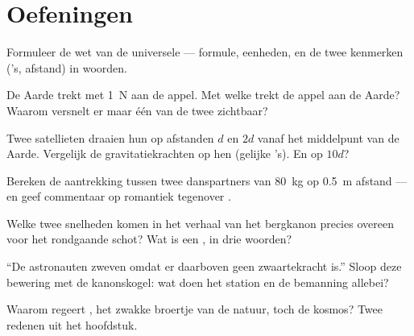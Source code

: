\section{Oefeningen}

\begin{exercise}[$\star$]\label{exo:g9:gravitation:1}
Formuleer de wet van de universele  --- formule,
eenheden, en de twee kenmerken ('s, afstand) in woorden.
\end{exercise}

\begin{exercise}[$\star$]\label{exo:g9:gravitation:2}
De Aarde trekt met \qty{1}{N} aan de appel. Met welke
 trekt de appel aan de Aarde? Waarom versnelt er maar
één van de twee zichtbaar?
\end{exercise}

\begin{exercise}[$\star$]\label{exo:g9:gravitation:3}
Twee satellieten draaien hun  op afstanden $d$ en $2d$
vanaf het middelpunt van de Aarde. Vergelijk de
gravitatiekrachten op hen (gelijke 's). En op $10 d$?
\end{exercise}

\begin{exercise}[$\star$]\label{exo:g9:gravitation:4}
Bereken de aantrekking tussen twee danspartners van \qty{80}{kg} op
\qty{0.5}{m} afstand --- en geef commentaar op romantiek tegenover
.
\end{exercise}

\begin{exercise}[$\star$]\label{exo:g9:gravitation:5}
Welke twee snelheden komen in het verhaal van het bergkanon precies
overeen voor het rondgaande schot? Wat is een , in drie
woorden?
\end{exercise}

\begin{exercise}[$\star$]\label{exo:g9:gravitation:6}
``De astronauten zweven omdat er daarboven geen zwaartekracht
is.'' Sloop deze bewering met de kanonskogel: wat doen het station en de
bemanning allebei?
\end{exercise}

\begin{exercise}[$\star$]\label{exo:g9:gravitation:7}
Waarom regeert , het zwakke broertje van de natuur,
toch de kosmos? Twee redenen uit het hoofdstuk.
\end{exercise}

